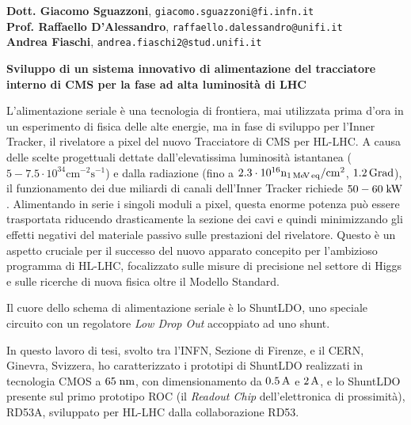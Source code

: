 \documentclass[a4paper,12pt,italian]{article}
\begin{document}

\pagestyle{plain}
\noindent

 {\bf Dott. Giacomo Sguazzoni}, {\tt giacomo.sguazzoni@fi.infn.it}\\
 {\bf Prof. Raffaello D'Alessandro}, {\tt raffaello.dalessandro@unifi.it}\\
 {\bf Andrea Fiaschi}, {\tt andrea.fiaschi2@stud.unifi.it}

\vskip 0.5cm

\noindent \textbf{Sviluppo di un sistema innovativo di alimentazione del tracciatore interno di CMS per la fase ad alta luminosità di LHC}

\vskip 0.5cm

 L'alimentazione seriale \`e una tecnologia di frontiera, mai utilizzata prima d'ora in un esperimento di fisica delle alte energie, ma in fase di sviluppo per l'Inner Tracker, il rivelatore a pixel del nuovo Tracciatore di CMS per HL-LHC. A causa delle scelte progettuali dettate dall'elevatissima luminosit\`a istantanea ($\mathrm{5-7.5\cdot 10^{34}cm^{-2}s^{-1}}$) e dalla radiazione (fino a $\mathrm{2.3\cdot10^{16} n_{1{\rm \, Me\kern-0.125em V}\, eq}/cm^2}$, $1.2{\rm \, Grad}$), il funzionamento dei due miliardi di canali dell'Inner Tracker richiede $50-60\rm \; kW$. Alimentando in serie i singoli moduli a pixel,
questa enorme potenza pu\`o essere trasportata riducendo drasticamente la sezione dei cavi e quindi minimizzando gli effetti negativi del materiale passivo sulle prestazioni del rivelatore.
Questo \`e un aspetto cruciale per il successo del nuovo apparato concepito per l'ambizioso programma di HL-LHC, focalizzato sulle misure di precisione nel settore di Higgs e sulle ricerche di nuova fisica oltre il Modello Standard.

Il cuore dello schema di alimentazione seriale \`e lo ShuntLDO, uno speciale circuito con un regolatore \textit{Low Drop Out} accoppiato ad uno shunt. 

In questo lavoro di tesi, svolto tra l'INFN, Sezione di Firenze, e il CERN, Ginevra, Svizzera, ho caratterizzato i prototipi di ShuntLDO realizzati in tecnologia CMOS a $65\rm \; nm$, con dimensionamento da $0.5\rm \, A$ e $2\rm \, A$, e lo ShuntLDO presente sul primo prototipo ROC (il \textit{Readout Chip} dell'elettronica di prossimit\`a), RD53A, sviluppato per HL-LHC dalla collaborazione RD53. 
\end{document}
